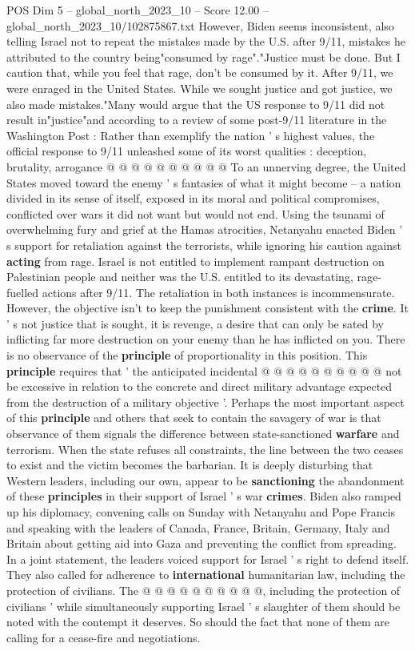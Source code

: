 \begin{textsample}{POS Dim 5 – global\_north\_2023\_10 – Score 12.00 – global\_north\_2023\_10/102875867.txt}
However, Biden seems inconsistent, also telling Israel not to repeat the mistakes made by the U.S. after 9/11, mistakes he attributed to the country being"consumed by rage"."Justice must be done.
But I caution that, while you feel that rage, don't be consumed by it.
After 9/11, we were enraged in the United States.
While we sought justice and got justice, we also made mistakes."Many would argue that the US response to 9/11 did not result in"justice"and according to a review of some post-9/11 literature in the Washington Post : Rather than exemplify the nation ' s highest values, the official response to 9/11 unleashed some of its worst qualities : deception, brutality, arrogance @ @ @ @ @ @ @ @ @ @ To an unnerving degree, the United States moved toward the enemy ' s fantasies of what it might become -- a nation divided in its sense of itself, exposed in its moral and political compromises, conflicted over wars it did not want but would not end.
Using the tsunami of overwhelming fury and grief at the Hamas atrocities, Netanyahu enacted Biden ' s support for retaliation against the terrorists, while ignoring his caution against \textbf{acting} from rage.
Israel is not entitled to implement rampant destruction on Palestinian people and neither was the U.S. entitled to its devastating, rage-fuelled actions after 9/11.
The retaliation in both instances is incommensurate.
However, the objective isn't to keep the punishment consistent with the \textbf{crime}.
It ' s not justice that is sought, it is revenge, a desire that can only be sated by inflicting far more destruction on your enemy than he has inflicted on you.
There is no observance of the \textbf{principle} of proportionality in this position.
This \textbf{principle} requires that ' the anticipated incidental @ @ @ @ @ @ @ @ @ @ not be excessive in relation to the concrete and direct military advantage expected from the destruction of a military objective '.
Perhaps the most important aspect of this \textbf{principle} and others that seek to contain the savagery of war is that observance of them signals the difference between state-sanctioned \textbf{warfare} and terrorism.
When the state refuses all constraints, the line between the two ceases to exist and the victim becomes the barbarian.
It is deeply disturbing that Western leaders, including our own, appear to be \textbf{sanctioning} the abandonment of these \textbf{principles} in their support of Israel ' s war \textbf{crimes}.
Biden also ramped up his diplomacy, convening calls on Sunday with Netanyahu and Pope Francis and speaking with the leaders of Canada, France, Britain, Germany, Italy and Britain about getting aid into Gaza and preventing the conflict from spreading.
In a joint statement, the leaders voiced support for Israel ' s right to defend itself.
They also called for adherence to \textbf{international} humanitarian law, including the protection of civilians.
The @ @ @ @ @ @ @ @ @ @, including the protection of civilians ' while simultaneously supporting Israel ' s slaughter of them should be noted with the contempt it deserves.
So should the fact that none of them are calling for a cease-fire and negotiations.


\end{textsample}
